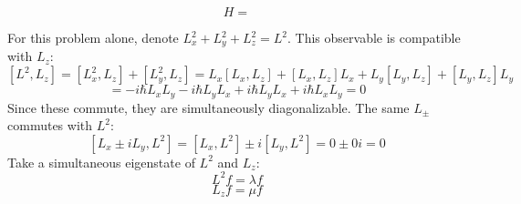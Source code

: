 \documentclass{article}
\begin{document}
\[
  H =
\]


For this problem alone, denote $L_{x}^{2} + L_{y}^{2} + L_{z}^{2} = L^{2}$.
This observable is compatible with $L_{z}$:
\[
  [L^{2}, L_{z}] = [L_{x}^{2}, L_{z}] + [L_{y}^{2}, L_{z}]
  = L_{x}[L_{x}, L_{z}] + [L_{x}, L_{z}]L_{x} + L_{y}[L_{y}, L_{z}] + [L_{y}, L_{z}]L_{y}
\]
\[
  = -i\hbar L_{x}L_{y} - i\hbar L_{y}L_{x} + i\hbar L_{y}L_{x} + i\hbar L_{x}L_{y}
  = 0
\]
Since these commute, they are simultaneously diagonalizable.
The same $L_{\pm}$ commutes with $L^{2}$:
\[
  [L_{x}\pm iL_{y}, L^{2}] = [L_{x}, L^{2}] \pm i[L_{y}, L^{2}] = 0 \pm 0i = 0
\]
Take a simultaneous eigenstate of $L^{2}$ and $L_{z}$:
\[
  L^{2}f = \lambda f
\]
\[
  L_{z}f = \mu f
\]
\end{document}
